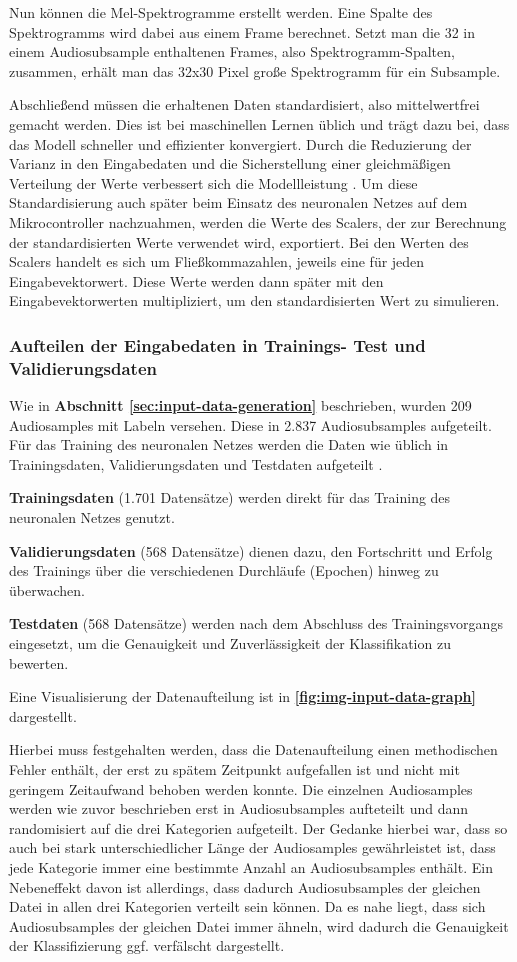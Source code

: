Nun können die Mel-Spektrogramme erstellt werden. Eine Spalte des Spektrogramms wird dabei aus einem Frame berechnet. Setzt man die 32 in einem Audiosubsample enthaltenen Frames, also Spektrogramm-Spalten, zusammen, erhält man das 32x30 Pixel große Spektrogramm für ein Subsample.

Abschließend müssen die erhaltenen Daten standardisiert, also mittelwertfrei gemacht werden. Dies ist bei maschinellen Lernen üblich und trägt dazu bei, dass das Modell schneller und effizienter konvergiert. Durch die Reduzierung der Varianz in den Eingabedaten und die Sicherstellung einer gleichmäßigen Verteilung der Werte verbessert sich die Modellleistung \cite{ml-standardization-reason}. Um diese Standardisierung auch später beim Einsatz des neuronalen Netzes auf dem Mikrocontroller nachzuahmen, werden die Werte des Scalers, der zur Berechnung der standardisierten Werte verwendet wird, exportiert. Bei den Werten des Scalers handelt es sich um Fließkommazahlen, jeweils eine für jeden Eingabevektorwert. Diese Werte werden dann später mit den Eingabevektorwerten multipliziert, um den standardisierten Wert zu simulieren.


\subsubsection{Aufteilen der Eingabedaten in Trainings- Test und Validierungsdaten}
Wie in \textbf{Abschnitt \ref{sec:input-data-generation} }beschrieben, wurden 209 Audiosamples mit Labeln versehen. Diese  in 2.837 Audiosubsamples aufgeteilt. Für das Training des neuronalen Netzes werden die Daten wie üblich in Trainingsdaten, Validierungsdaten und Testdaten aufgeteilt \cite{ml-data-splitting-reason}.

\textbf{Trainingsdaten} (1.701 Datensätze) werden direkt für das Training des neuronalen Netzes genutzt.

\textbf{Validierungsdaten} (568 Datensätze) dienen dazu, den Fortschritt und Erfolg des Trainings über die verschiedenen Durchläufe (Epochen) hinweg zu überwachen.

\textbf{Testdaten} (568 Datensätze) werden nach dem Abschluss des Trainingsvorgangs eingesetzt, um die Genauigkeit und Zuverlässigkeit der Klassifikation zu bewerten.

Eine Visualisierung der Datenaufteilung ist in \textbf{\autoref{fig:img-input-data-graph}} dargestellt.

Hierbei muss festgehalten werden, dass die Datenaufteilung einen methodischen Fehler enthält, der erst zu spätem Zeitpunkt aufgefallen ist und nicht mit geringem Zeitaufwand behoben werden konnte. Die einzelnen Audiosamples werden wie zuvor beschrieben erst in Audiosubsamples aufteteilt und dann randomisiert auf die drei Kategorien aufgeteilt. Der Gedanke hierbei war, dass so auch bei stark unterschiedlicher Länge der Audiosamples gewährleistet ist, dass jede Kategorie immer eine bestimmte Anzahl an Audiosubsamples enthält. Ein Nebeneffekt davon ist allerdings, dass dadurch Audiosubsamples der gleichen Datei in allen drei Kategorien verteilt sein können. Da es nahe liegt, dass sich Audiosubsamples der gleichen Datei immer ähneln, wird dadurch die Genauigkeit der Klassifizierung ggf. verfälscht dargestellt.

